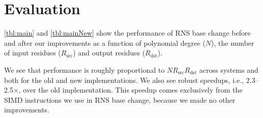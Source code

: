 \section{Evaluation}\label{sec:evaluation}

\tblMain
\tblMainNew

\autoref{tbl:main} and \autoref{tbl:mainNew} show the performance of RNS base
change before and after our improvements as a function of polynomial degree
($N$), the number of input residues ($R_{\textrm{src}}$) and output residues
($R_{\textrm{dst}}$).

We see that performance is roughly proportional to $N R_{\textrm{src}}
R_{\textrm{dst}}$ across systems and both for the old and new implementations.
We also see robust speedups, i.e., 2.3--2.5$\times$, over the old implementation.
This speedup comes exclusively from the SIMD instructions we use in RNS base
change, because we made no other improvements.
